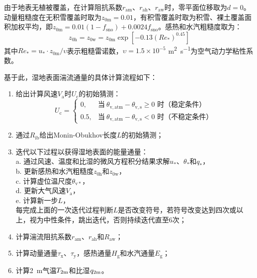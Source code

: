 由于地表无植被覆盖，在计算阻抗系数$r_{\mathrm{am}}$、$r_{\mathrm{ah}}$、$r_{\mathrm{aw}}$时，零平面位移取为$d=0$。动量粗糙度在无积雪覆盖时取为$z_{\mathrm{0m}}=0.01$，有积雪覆盖时取为积雪、裸土覆盖面积加权平均，即$z_{\mathrm{0m}}=0.01 \left(1-f_{\mathrm{sno}}\right)+0.0024 f_{\mathrm{sno}}$。感热和水汽粗糙度取为：
\begin{equation}
  z_{\mathrm{0h}}=z_{\mathrm{0w}}=z_{\mathrm{0m}}\exp{\left[-0.13\left(Re_*\right)^{0.45}\right]}
\end{equation}
其中$Re_*=u_*\cdot z_{\mathrm{0m}}/\upsilon$表示粗糙雷诺数，$\upsilon= 1.5 \times 10^{-5}$ \unit{m^2.s^{-1}}为空气动力学粘性系数。

基于此，湿地表面湍流通量的具体计算流程如下：
\begin{enumerate}
  \item 给出计算风速$V_{\mathrm {a}} $时$U_{\mathrm {c}} $的初始猜测：
    \begin{equation}
      U_{\mathrm {c}}  = \begin{cases}
        0, &\text{当}\ \theta_{\mathrm{v,atm}}-\theta_{\mathrm{v,s}} \geqslant 0 \text{ 时（稳定条件）} \\
        0.5, &\text{当}\ \theta_{\mathrm{v,atm}}-\theta_{\mathrm{v,s}} < 0 \text{ 时（不稳定条件）}
      \end{cases}
    \end{equation}
  \item 通过$R_{\mathrm{ib}}$给出Monin-Obukhov长度$L$的初始猜测；
  \item 迭代以下过程以获得湿地表面的能量通量：\\
    a. 通过风速、温度和比湿的微风方程积分结果求解$u_*$、$\theta_*$和$q_*$，\\
    b. 更新感热和水汽粗糙度$z_{\mathrm{0h}}$和$z_{\mathrm{0w}}$，\\
    c. 计算虚位温尺度$\theta_{\mathrm{v*}}$，\\
    d. 更新大气风速$V_{\mathrm {a}} $，\\
    e. 计算新一步$L$，\\
    每完成上面的一次迭代过程判断$L$是否改变符号，若符号改变达到四次或以上，视为中性条件，跳出迭代，否则持续迭代直至6次；
  \item 计算湍流阻抗系数$r_{\mathrm{am}}$、$r_{\mathrm{ah}}$和$R_{\mathrm{aw}}$；
  \item 计算动量通量$\tau_{\mathrm {x}} $、$\tau_{\mathrm {y}} $，感热通量$H_{\mathrm {g}} $和水汽通量$E_{\mathrm {g}} $；
  \item 计算\qty{2}{m}气温$T_{\rm 2m}$和比湿$q_{\rm 2m}$。
\end{enumerate}

